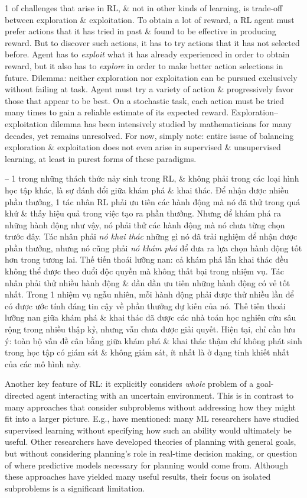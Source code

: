 \documentclass{article}
\begin{document}
\begin{itemize}
\begin{itemize}
        1 of challenges that arise in RL, \& not in other kinds of learning, is trade-off between exploration \& exploitation. To obtain a lot of reward, a RL agent must prefer actions that it has tried in past \& found to be effective in producing reward. But to discover such actions, it has to try actions that it has not selected before. Agent has to {\it exploit} what it has already experienced in order to obtain reward, but it also has to {\it explore} in order to make better action selections in future. Dilemma: neither exploration nor exploitation can be pursued exclusively without failing at task. Agent must try a variety of action \& progressively favor those that appear to be best. On a stochastic task, each action must be tried many times to gain a reliable estimate of its expected reward. Exploration--exploitation dilemma has been intensively studied by mathematicians for many decades, yet remains unresolved. For now, simply note: entire issue of balancing exploration \& exploitation does not even arise in supervised \& unsupervised learning, at least in purest forms of these paradigms.

        -- 1 trong những thách thức nảy sinh trong RL, \& không phải trong các loại hình học tập khác, là sự đánh đổi giữa khám phá \& khai thác. Để nhận được nhiều phần thưởng, 1 tác nhân RL phải ưu tiên các hành động mà nó đã thử trong quá khứ \& thấy hiệu quả trong việc tạo ra phần thưởng. Nhưng để khám phá ra những hành động như vậy, nó phải thử các hành động mà nó chưa từng chọn trước đây. Tác nhân phải {\it nó khai thác} những gì nó đã trải nghiệm để nhận được phần thưởng, nhưng nó cũng phải {\it nó khám phá} để đưa ra lựa chọn hành động tốt hơn trong tương lai. Thế tiến thoái lưỡng nan: cả khám phá lẫn khai thác đều không thể được theo đuổi độc quyền mà không thất bại trong nhiệm vụ. Tác nhân phải thử nhiều hành động \& dần dần ưu tiên những hành động có vẻ tốt nhất. Trong 1 nhiệm vụ ngẫu nhiên, mỗi hành động phải được thử nhiều lần để có được ước tính đáng tin cậy về phần thưởng dự kiến của nó. Thế tiến thoái lưỡng nan giữa khám phá \& khai thác đã được các nhà toán học nghiên cứu sâu rộng trong nhiều thập kỷ, nhưng vẫn chưa được giải quyết. Hiện tại, chỉ cần lưu ý: toàn bộ vấn đề cân bằng giữa khám phá \& khai thác thậm chí không phát sinh trong học tập có giám sát \& không giám sát, ít nhất là ở dạng tinh khiết nhất của các mô hình này.

        Another key feature of RL: it explicitly considers {\it whole} problem of a goal-directed agent interacting with an uncertain environment. This is in contrast to many approaches that consider subproblems without addressing how they might fit into a larger picture. E.g., have mentioned: many ML researchers have studied supervised learning without specifying how such an ability would ultimately be useful. Other researchers have developed theories of planning with general goals, but without considering planning's role in real-time decision making, or question of where predictive models necessary for planning would come from. Although these approaches have yielded many useful results, their focus on isolated subproblems is a significant limitation.


\end{itemize}
\end{itemize}
\end{document}
